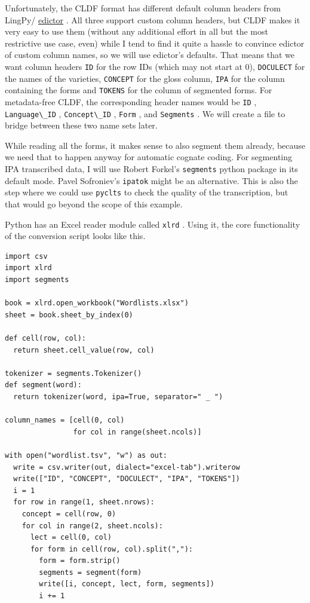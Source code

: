 \documentclass[
  english,
  a4paper,
  oneside,tablecaptionabove
]{scrbook}
\newcommand{\passthrough}[1]{#1}
\begin{document}
Unfortunately, the CLDF format has different default column headers from
LingPy/ \href{http://edictor.digling.org}{edictor} . All three support
custom column headers, but CLDF makes it very easy to use them (without
any additional effort in all but the most restrictive use case, even)
while I tend to find it quite a hassle to convince edictor of custom
column names, so we will use edictor's defaults. That means that we want
column headers \passthrough{\lstinline!ID!} for the row IDs (which may
not start at 0), \passthrough{\lstinline!DOCULECT!} for the names of the
varieties, \passthrough{\lstinline!CONCEPT!} for the gloss column,
\passthrough{\lstinline!IPA!} for the column containing the forms and
\passthrough{\lstinline!TOKENS!} for the column of segmented forms. For
metadata-free CLDF, the corresponding header names would be
\passthrough{\lstinline!ID!} , \passthrough{\lstinline!Language\_ID!} ,
\passthrough{\lstinline!Concept\_ID!} , \passthrough{\lstinline!Form!} ,
and \passthrough{\lstinline!Segments!} . We will create a file to bridge
between these two name sets later.

While reading all the forms, it makes sense to also segment them
already, because we need that to happen anyway for automatic cognate
coding. For segmenting IPA transcribed data, I will use Robert Forkel's
\passthrough{\lstinline!segments!} python package in its default mode.
Pavel Sofroniev's \passthrough{\lstinline!ipatok!} might be an
alternative. This is also the step where we could use
\passthrough{\lstinline!pyclts!} to check the quality of the
transcription, but that would go beyond the scope of this example.

Python has an Excel reader module called \passthrough{\lstinline!xlrd!}
. Using it, the core functionality of the conversion script looks like
this.

\begin{lstlisting}
import csv
import xlrd
import segments

book = xlrd.open_workbook("Wordlists.xlsx")
sheet = book.sheet_by_index(0)

def cell(row, col):
  return sheet.cell_value(row, col)

tokenizer = segments.Tokenizer()
def segment(word):
  return tokenizer(word, ipa=True, separator=" _ ")

column_names = [cell(0, col)
                for col in range(sheet.ncols)]

with open("wordlist.tsv", "w") as out:
  write = csv.writer(out, dialect="excel-tab").writerow
  write(["ID", "CONCEPT", "DOCULECT", "IPA", "TOKENS"])
  i = 1
  for row in range(1, sheet.nrows):
    concept = cell(row, 0)
    for col in range(2, sheet.ncols):
      lect = cell(0, col)
      for form in cell(row, col).split(","):
        form = form.strip()
        segments = segment(form)
        write([i, concept, lect, form, segments])
        i += 1
\end{lstlisting}
\end{document}
